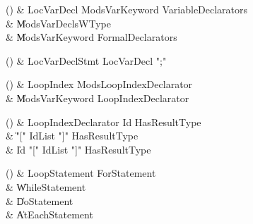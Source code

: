 \begin{bbgrammarappendix}

() & LocVarDecl \label{prod:LocVarDecl}  \: Mods\opt VarKeyword VariableDeclarators  \\

 &    \| Mods\opt VarDeclsWType \\
 &    \| Mods\opt VarKeyword FormalDeclarators \\

\end{bbgrammarappendix}

\begin{bbgrammarappendix}

() & LocVarDeclStmt \label{prod:LocVarDeclStmt}  \: LocVarDecl \xcd";"  \\


\end{bbgrammarappendix}

\begin{bbgrammarappendix}

() & LoopIndex \label{prod:LoopIndex}  \: Mods\opt LoopIndexDeclarator  \\

 &    \| Mods\opt VarKeyword LoopIndexDeclarator \\

\end{bbgrammarappendix}

\begin{bbgrammarappendix}

() & LoopIndexDeclarator \label{prod:LoopIndexDeclarator}  \: Id HasResultType\opt  \\

 &    \| \xcd"[" IdList \xcd"]" HasResultType\opt \\
 &    \| Id \xcd"[" IdList \xcd"]" HasResultType\opt \\

\end{bbgrammarappendix}

\begin{bbgrammarappendix}

() & LoopStatement \label{prod:LoopStatement}  \: ForStatement  \\

 &    \| WhileStatement \\
 &    \| DoStatement \\
 &    \| AtEachStatement \\

\end{bbgrammarappendix}

